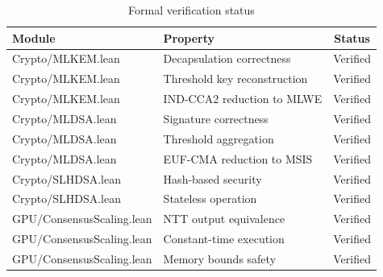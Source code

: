 \begin{table}[h]
\centering
\begin{tabular}{llc}
\toprule
\textbf{Module} & \textbf{Property} & \textbf{Status} \\
\midrule
Crypto/MLKEM.lean & Decapsulation correctness & Verified \\
Crypto/MLKEM.lean & Threshold key reconstruction & Verified \\
Crypto/MLKEM.lean & IND-CCA2 reduction to MLWE & Verified \\
Crypto/MLDSA.lean & Signature correctness & Verified \\
Crypto/MLDSA.lean & Threshold aggregation & Verified \\
Crypto/MLDSA.lean & EUF-CMA reduction to MSIS & Verified \\
Crypto/SLHDSA.lean & Hash-based security & Verified \\
Crypto/SLHDSA.lean & Stateless operation & Verified \\
GPU/ConsensusScaling.lean & NTT output equivalence & Verified \\
GPU/ConsensusScaling.lean & Constant-time execution & Verified \\
GPU/ConsensusScaling.lean & Memory bounds safety & Verified \\
\bottomrule
\end{tabular}
\caption{Formal verification status}
\label{tab:verification}
\end{table}

